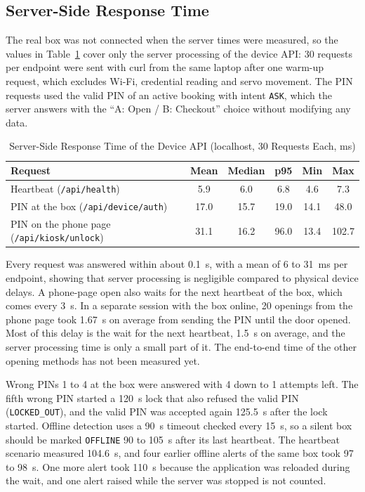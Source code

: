 \subsection{Server-Side Response Time}
\label{sec:latency}

The real box was not connected when the server times were measured, so the values in Table~\ref{tab:latency} cover
only the server processing of the device API: 30 requests per endpoint were sent with curl from the same laptop after
one warm-up request, which excludes Wi-Fi, credential reading and servo movement. The PIN requests used the valid PIN
of an active booking with intent \texttt{ASK}, which the server answers with the ``A: Open / B: Checkout'' choice without
modifying any data.

\begin{table}[!htbp]\renewcommand{\arraystretch}{0.88}
\renewcommand{\arraystretch}{1.0}
\centering
\small
\caption{Server-Side Response Time of the Device API (localhost, 30 Requests Each, ms)}
\label{tab:latency}
\footnotesize
\begin{tabular}{l c c c c c}
\hline
Request & Mean & Median & p95 & Min & Max \\
\hline
Heartbeat (\texttt{/api/health})                   & 5.9  & 6.0  & 6.8  & 4.6  & 7.3 \\
PIN at the box (\texttt{/api/device/auth})         & 17.0 & 15.7 & 19.0 & 14.1 & 48.0 \\
PIN on the phone page (\texttt{/api/kiosk/unlock}) & 31.1 & 16.2 & 96.0 & 13.4 & 102.7 \\
\hline
\end{tabular}
\end{table}

Every request was answered within about 0.1~s, with a mean of 6 to 31~ms per endpoint, showing that server processing
is negligible compared to physical device delays. A phone-page open also waits for the next heartbeat of the box, which
comes every 3~s. In a separate session with the box online, 20 openings from the phone page took 1.67~s on average
from sending the PIN until the door opened. Most of this delay is the wait for the next heartbeat, 1.5~s on average,
and the server processing time is only a small part of it. The end-to-end time of the other opening methods has not
been measured yet.

Wrong PINs 1 to 4 at the box were answered with 4 down to 1 attempts left. The fifth wrong PIN started a 120~s lock
that also refused the valid PIN (\texttt{LOCKED\_OUT}), and the valid PIN was accepted again 125.5~s after the lock
started. Offline detection uses a 90~s timeout checked every 15~s, so a silent box should be marked \texttt{OFFLINE}
90 to 105~s after its last heartbeat. The heartbeat scenario measured 104.6~s, and four earlier offline alerts of the
same box took 97 to 98~s. One more alert took 110~s because the application was reloaded during the wait, and one alert
raised while the server was stopped is not counted.

